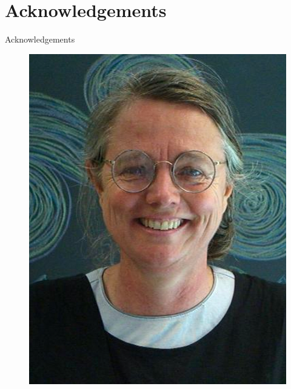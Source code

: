 \documentclass{beamer}
\begin{document}
\appendix

\section{Acknowledgements}
\begin{frame}{Acknowledgements}
  \begin{figure}
    \centering
    \includegraphics[scale=.39]{susan_blackboard.png}
  \end{figure}
\end{frame}
\end{document}

